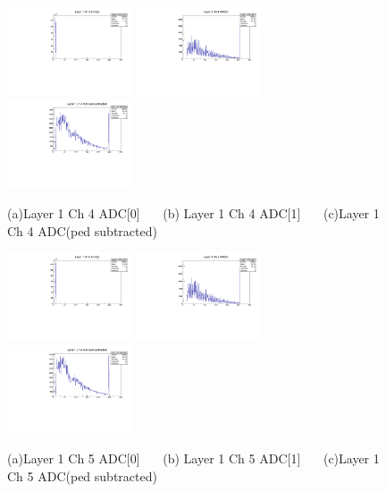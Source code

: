 \documentclass[a4paper,11pt]{article}
\theoremstyle{mytheor}
\begin{document}
\begin{figure}[H] 
\vspace*{-0.3cm} 
\includegraphics[width=0.33\textwidth,scale=0.5,trim=0 0 0 0,clip]{plotsdir/file0_test-Layer1_Ch4_adc0-1.pdf} 
\includegraphics[width=0.33\textwidth,scale=0.5,trim=0 0 0 0,clip]{plotsdir/file0_test-Layer1_Ch4_adc1-1.pdf} 
\includegraphics[width=0.33\textwidth,scale=0.5,trim=0 0 0 0,clip]{plotsdir/file0_test-Layer1_Ch4_adcPedsub-1.pdf} 
\caption{(a)Layer 1 Ch 4 ADC[0] ~~~(b) Layer 1 Ch 4 ADC[1] ~~~(c)Layer 1 Ch 4 ADC(ped subtracted) } 
\end{figure} 
\begin{figure}[H] 
\vspace*{-0.3cm} 
\includegraphics[width=0.33\textwidth,scale=0.5,trim=0 0 0 0,clip]{plotsdir/file0_test-Layer1_Ch5_adc0-1.pdf} 
\includegraphics[width=0.33\textwidth,scale=0.5,trim=0 0 0 0,clip]{plotsdir/file0_test-Layer1_Ch5_adc1-1.pdf} 
\includegraphics[width=0.33\textwidth,scale=0.5,trim=0 0 0 0,clip]{plotsdir/file0_test-Layer1_Ch5_adcPedsub-1.pdf} 
\caption{(a)Layer 1 Ch 5 ADC[0] ~~~(b) Layer 1 Ch 5 ADC[1] ~~~(c)Layer 1 Ch 5 ADC(ped subtracted) } 
\end{figure} 
\end{document}

